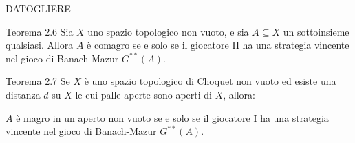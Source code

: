 \documentclass[babel]{beamer}
\renewcommand{\href}[2]{#2}
\begin{document}
\begin{frame}[label={sec:org70e3b80}]{DATOGLIERE}
\begin{alertblock}{Teorema 2.6}
Sia \(X\) uno \href{../../../../../../../org/roam/20250103145124-topologia.org}{spazio topologico} \href{../../../../../../../org/roam/20250131161811-insieme_vuoto_mk.org}{non vuoto}, e sia \(A \subseteq X\) un \href{../../../../../../../org/roam/20250131155822-operazioni_insiemistiche_tra_classi_mk.org}{sottoinsieme} qualsiasi. Allora \(A\) è \href{../../../../../../../org/roam/20250419122752-insieme_magro.org}{comagro} se e solo se il giocatore II ha una \href{../../../../../../../org/roam/20250513171520-giochi_di_gale_stewart.org}{strategia vincente} nel \href{../../../../../../../org/roam/20250513111844-gioco_di_banach_mazur.org}{gioco di Banach-Mazur} \(G^{**}(A)\).
\end{alertblock}
\begin{alertblock}{Teorema 2.7}
Se \(X\) è uno \href{../../../../../../../org/roam/20250103145124-topologia.org}{spazio topologico} \href{../../../../../../../org/roam/20250514174255-gioco_di_choquet.org}{di Choquet} non \href{../../../../../../../org/roam/20250131161811-insieme_vuoto_mk.org}{vuoto} ed esiste una \href{../../../../../../../org/roam/20250301193511-spazio_metrico.org}{distanza} \(d\) su \(X\) le cui \href{../../../../../../../org/roam/20250301193511-spazio_metrico.org}{palle aperte} sono aperti di \(X\), allora:

\(A\) è \href{../../../../../../../org/roam/20250419122752-insieme_magro.org}{magro} in un \href{../../../../../../../org/roam/20250103145124-topologia.org}{aperto} non vuoto se e solo se il giocatore I ha una \href{../../../../../../../org/roam/20250513171520-giochi_di_gale_stewart.org}{strategia vincente} nel \href{../../../../../../../org/roam/20250513111844-gioco_di_banach_mazur.org}{gioco di Banach-Mazur} \(G^{**}(A)\).
\end{alertblock}
\end{frame}
\end{document}
